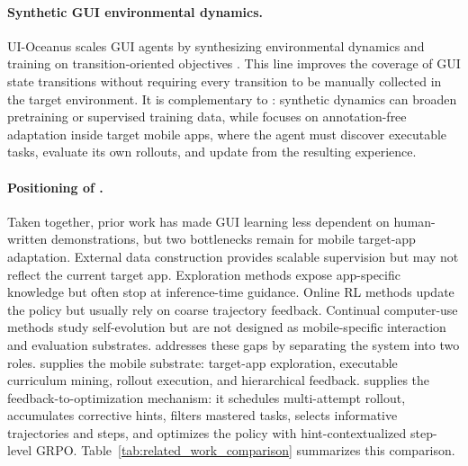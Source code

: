 \paragraph{Synthetic GUI environmental dynamics.}
UI-Oceanus scales GUI agents by synthesizing environmental dynamics and training on transition-oriented objectives \citep{wu2026uioceanus}. This line improves the coverage of GUI state transitions without requiring every transition to be manually collected in the target environment. It is complementary to \ourmethod: synthetic dynamics can broaden pretraining or supervised training data, while \ourmethod focuses on annotation-free adaptation inside target mobile apps, where the agent must discover executable tasks, evaluate its own rollouts, and update from the resulting experience.

\paragraph{Positioning of \ourmethod.}
Taken together, prior work has made GUI learning less dependent on human-written demonstrations, but two bottlenecks remain for mobile target-app adaptation. External data construction provides scalable supervision but may not reflect the current target app. Exploration methods expose app-specific knowledge but often stop at inference-time guidance. Online RL methods update the policy but usually rely on coarse trajectory feedback. Continual computer-use methods study self-evolution but are not designed as mobile-specific interaction and evaluation substrates. \ourmethod addresses these gaps by separating the system into two roles. \mobilegym supplies the mobile substrate: target-app exploration, executable curriculum mining, rollout execution, and hierarchical feedback. \hifpo supplies the feedback-to-optimization mechanism: it schedules multi-attempt rollout, accumulates corrective hints, filters mastered tasks, selects informative trajectories and steps, and optimizes the policy with hint-contextualized step-level GRPO. Table~\ref{tab:related_work_comparison} summarizes this comparison.


